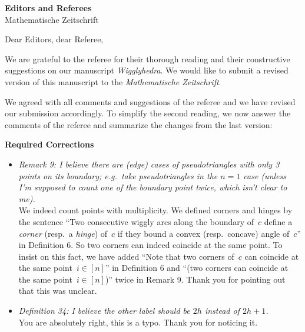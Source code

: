 \documentclass{letter}
\begin{document}
\begin{letter}{{\bf Editors and Referees} \\ Mathematische Zeitschrift}
\opening{Dear Editors, dear Referee,}

We are grateful to the referee for their thorough reading and their constructive suggestions on our manuscript \emph{Wigglyhedra}. We would like to submit a revised version of this manuscript to the \emph{Mathematische Zeitschrift}. 

We agreed with all comments and suggestions of the referee and we have revised our submission accordingly. To simplify the second reading, we now answer the comments of the referee and summarize the changes from the last version:

{\bf Required Corrections}

\begin{itemize}
\item \textsl{\color{gray} Remark 9: I believe there are (edge) cases of pseudotriangles with only 3 points on its boundary; e.g.~take pseudotriangles in the $n = 1$ case (unless I’m supposed to count one of the boundary point twice, which isn’t clear to me).} \\
We indeed count points with multiplicity. We defined corners and hinges by the sentence ``Two consecutive wiggly arcs along the boundary of~$c$ define a \emph{corner} (resp.~a \emph{hinge}) of~$c$ if they bound a convex (resp.~concave) angle of~$c$'' in Definition 6. So two corners can indeed coincide at the same point. To insist on this fact, we have added ``Note that two corners of~$c$ can coincide at the same point~$i \in [n]$'' in Definition 6 and ``(two corners can coincide at the same point~$i \in [n]$)'' twice in Remark 9. Thank you for pointing out that this was unclear.

\item \textsl{\color{gray} Definition 34: I believe the other label should be $2h$ instead of $2h+1$.} \\
You are absolutely right, this is a typo. Thank you for noticing it.


\end{itemize}
\end{letter}
\end{document}
